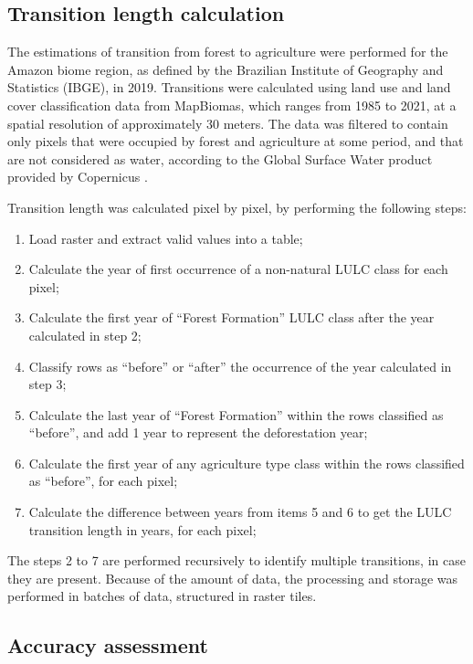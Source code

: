 \documentclass[essd, manuscript]{copernicus}
\begin{document}
\subsection{Transition length calculation}

The estimations of transition from forest to agriculture were performed for the Amazon biome region, as defined by the Brazilian Institute of Geography and Statistics (IBGE), in 2019.
Transitions were calculated using land use and land cover classification data from MapBiomas, which ranges from 1985 to 2021, at a spatial resolution of approximately 30 meters.
The data was filtered to contain only pixels that were occupied by forest and agriculture at some period, and that are not considered as water, according to the Global Surface Water product provided by Copernicus \citep{Pekel2016}.

Transition length was calculated pixel by pixel, by performing the following steps:

\begin{enumerate}
\def\labelenumi{\arabic{enumi}.}
\item
  Load raster and extract valid values into a table;
\item
  Calculate the year of first occurrence of a non-natural LULC class for each pixel;
\item
  Calculate the first year of ``Forest Formation'' LULC class after the year calculated in step 2;
\item
  Classify rows as ``before'' or ``after'' the occurrence of the year calculated in step 3;
\item
  Calculate the last year of ``Forest Formation'' within the rows classified as ``before'', and add 1 year to represent the deforestation year;
\item
  Calculate the first year of any agriculture type class within the rows classified as ``before'', for each pixel;
\item
  Calculate the difference between years from items 5 and 6 to get the LULC transition length in years, for each pixel;
\end{enumerate}

The steps 2 to 7 are performed recursively to identify multiple transitions, in case they are present.
Because of the amount of data, the processing and storage was performed in batches of data, structured in raster tiles.

\subsection{Accuracy assessment}
\end{document}
